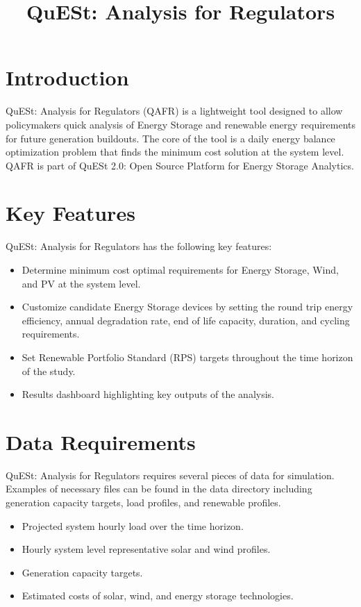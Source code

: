 \documentclass{article}
\title{QuESt: Analysis for Regulators}
\date{}
\begin{document}
\maketitle

\section{Introduction}
QuESt: Analysis for Regulators (QAFR) is a lightweight tool designed to allow policymakers quick analysis of Energy Storage and renewable energy requirements for future generation buildouts. The core of the tool is a daily energy balance optimization problem that finds the minimum cost solution at the system level. QAFR is part of QuESt 2.0: Open Source Platform for Energy Storage Analytics. 

\section{Key Features}
QuESt: Analysis for Regulators has the following key features:

\begin{itemize}
    \item Determine minimum cost optimal requirements for Energy Storage, Wind, and PV at the system level. 
    \item Customize candidate Energy Storage devices by setting the round trip energy efficiency, annual degradation rate, end of life capacity, duration, and cycling requirements. 
    \item Set Renewable Portfolio Standard (RPS) targets throughout the time horizon of the study.
    \item Results dashboard highlighting key outputs of the analysis. 
\end{itemize}

\section{Data Requirements}

QuESt: Analysis for Regulators requires several pieces of data for simulation. Examples of necessary files can be found in the data directory including generation capacity targets, load profiles, and renewable profiles.

\begin{itemize}
    \item Projected system hourly load over the time horizon. 
    \item Hourly system level representative solar and wind profiles.
    \item Generation capacity targets.
    \item Estimated costs of solar, wind, and energy storage technologies.
\end{itemize}
\end{document}
